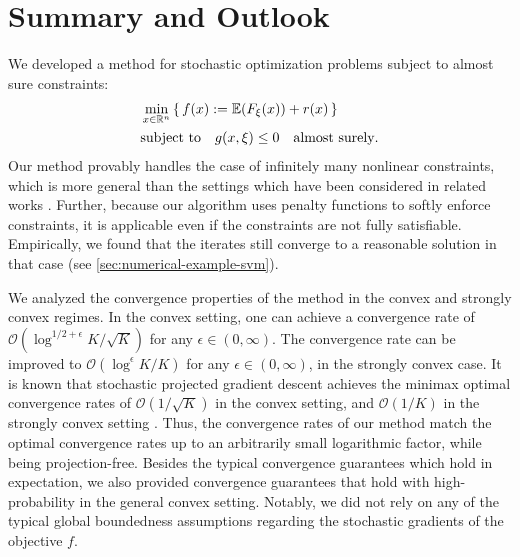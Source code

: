 \chapter{Summary and Outlook}
\label{chap:outlook}

We developed a method for stochastic optimization problems subject to almost sure constraints:
\begin{equation*}
    \begin{aligned}
    &\min_{x \in \mathbb{R}^n} \, \{\, f(x) := \mathbb{E}(F_\xi(x)) + r(x) \,\} \\
    &\textup{subject to} \quad g(x, \xi) \leq 0 \quad \textnormal{almost surely}.
    \end{aligned}
\end{equation*}
Our method provably handles the case of infinitely many nonlinear constraints,
which is more general than
the settings which have been considered in related works \cite{fercoq2019almost,xu2020primal,nedich2023huber,li2023softplus}.
Further, because our algorithm
uses penalty functions to softly enforce constraints, it is applicable even if the constraints
are not fully satisfiable.
Empirically, we found that the iterates still converge to a reasonable solution in
that case (see \cref{sec:numerical-example-svm}).

We analyzed the convergence
properties of the method in the convex and strongly convex regimes.
In the convex setting, one can achieve a convergence rate of
$\mathcal{O}(\log^{1/2 + \epsilon} K / \sqrt{K})$ for any $\epsilon \in (0,\infty)$.
The convergence rate can be improved
to $\mathcal{O}(\log^{\epsilon} K / K)$ for any $\epsilon \in (0,\infty)$, in the strongly convex case.
It is known that stochastic projected gradient descent achieves the minimax optimal convergence rates of
$\mathcal{O}(1/\sqrt{K})$ in the convex setting, and $\mathcal{O}(1/K)$ in the strongly convex setting \cite{nemirovski_yudin_1983,agarwal2009information}.
Thus, the convergence rates of our method match the optimal convergence rates
up to an arbitrarily small logarithmic factor, while being projection-free.
Besides the typical convergence guarantees which hold in expectation, we also provided convergence guarantees that hold
with high-probability in the general convex setting.
Notably, we did not rely on any of the typical
global boundedness assumptions regarding the stochastic gradients of the objective $f$.

